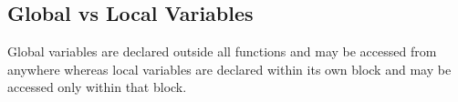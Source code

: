 \documentclass{article}
\begin{document}
\subsection{Global vs Local Variables}
Global variables are declared outside all functions and may be accessed from anywhere whereas local variables are declared within its own block and may be accessed only within that block.\\
\end{document}
